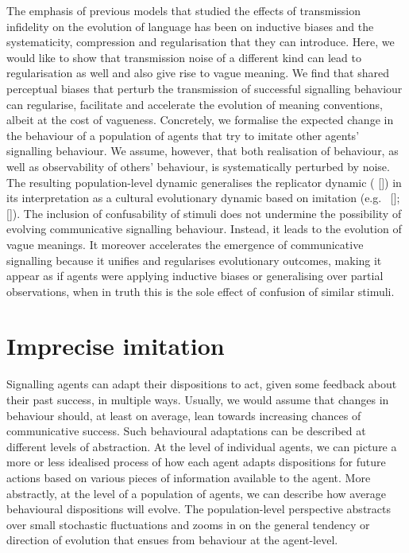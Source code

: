 \documentclass[12pt,english]{article}
\numberwithin{equation}{section}
\newcommand{\citealtbjps}[1]{\citeauthor{#1} [\citeyear{#1}]}
\newcommand{\citepbjps}[1]{(\citeauthor{#1} [\citeyear{#1}])}
\begin{document}
The emphasis of previous models that studied the effects of transmission infidelity on the
evolution of language has been on inductive biases and the systematicity, compression and
regularisation that they can introduce. Here, we would like to show that transmission noise of
a different kind can lead to regularisation as well and also give rise to vague meaning. We
find that shared perceptual biases that perturb the transmission of successful signalling
behaviour can regularise, facilitate and accelerate the evolution of meaning conventions, albeit
at the cost of vagueness. Concretely, we formalise the expected change in the behaviour of a
population of agents that try to imitate other agents' signalling behaviour. We assume, however,
that both realisation of behaviour, as well as observability of others' behaviour, is
systematically perturbed by noise. The resulting population-level dynamic generalises the
replicator dynamic \citepbjps{TaylorJonker1978:Evolutionary-St} in its interpretation as a cultural
evolutionary dynamic based on imitation
(e.g.~\citealtbjps{Helbing1996:A-Stochastic-Be}; \citealtbjps{Schlag1998:Why-Imitate-and}). The inclusion of
confusability of stimuli does not undermine the possibility of evolving communicative signalling
behaviour. Instead, it leads to the evolution of vague meanings. It moreover accelerates the
emergence of communicative signalling because it unifies and regularises evolutionary outcomes,
making it appear as if agents were applying inductive biases or generalising over partial
observations, when in truth this is the sole effect of confusion of similar stimuli.




\section{Imprecise imitation}
\label{sec:repl-diff-dynam}

Signalling agents can adapt their dispositions to act, given some feedback about their past
success, in multiple ways. Usually, we would assume that changes in behaviour should, at least
on average, lean towards increasing chances of communicative success. Such behavioural
adaptations can be described at different levels of abstraction. At the level of individual
agents, we can picture a more or less idealised process of how each agent adapts dispositions
for future actions based on various pieces of information available to the agent. More
abstractly, at the level of a population of agents, we can describe how average behavioural
dispositions will evolve. The population-level perspective abstracts over small stochastic
fluctuations and zooms in on the general tendency or direction of evolution that ensues from
behaviour at the agent-level.
\end{document}

